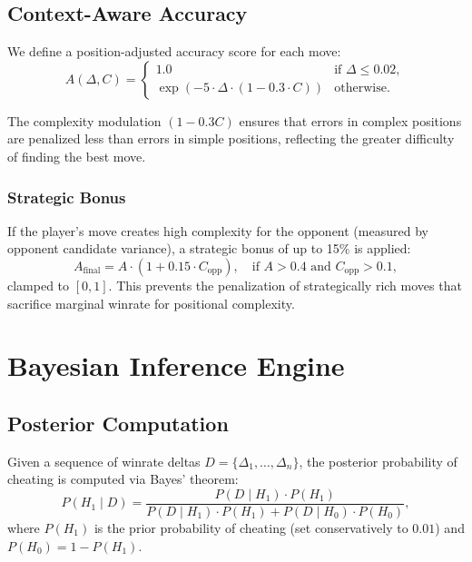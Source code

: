 \documentclass[11pt,a4paper]{article}
\begin{document}
\subsection{Context-Aware Accuracy}

We define a position-adjusted accuracy score for each move:
\begin{equation}
    A(\Delta, C) = \begin{cases}
        1.0 & \text{if } \Delta \leq 0.02, \\[4pt]
        \exp\!\left(-5 \cdot \Delta \cdot (1 - 0.3 \cdot C)\right) &
        \text{otherwise}.
    \end{cases}
    \label{eq:accuracy}
\end{equation}

The complexity modulation $(1 - 0.3C)$ ensures that errors in complex positions
are penalized less than errors in simple positions, reflecting the greater
difficulty of finding the best move.

\subsubsection{Strategic Bonus}

If the player's move creates high complexity for the opponent (measured by
opponent candidate variance), a strategic bonus of up to 15\% is applied:
\begin{equation}
    A_{\text{final}} = A \cdot (1 + 0.15 \cdot C_{\text{opp}}),
    \quad \text{if } A > 0.4 \text{ and } C_{\text{opp}} > 0.1,
    \label{eq:strategic_bonus}
\end{equation}
clamped to $[0, 1]$. This prevents the penalization of strategically rich
moves that sacrifice marginal winrate for positional complexity.


\section{Bayesian Inference Engine}
\label{sec:bayesian}

\subsection{Posterior Computation}

Given a sequence of winrate deltas $D = \{\Delta_1, \ldots, \Delta_n\}$, the
posterior probability of cheating is computed via Bayes' theorem:
\begin{equation}
    P(H_1 \mid D) = \frac{P(D \mid H_1) \cdot P(H_1)}{P(D \mid H_1) \cdot
    P(H_1) + P(D \mid H_0) \cdot P(H_0)},
    \label{eq:bayes}
\end{equation}
where $P(H_1)$ is the prior probability of cheating (set conservatively to
$0.01$) and $P(H_0) = 1 - P(H_1)$.
\end{document}

